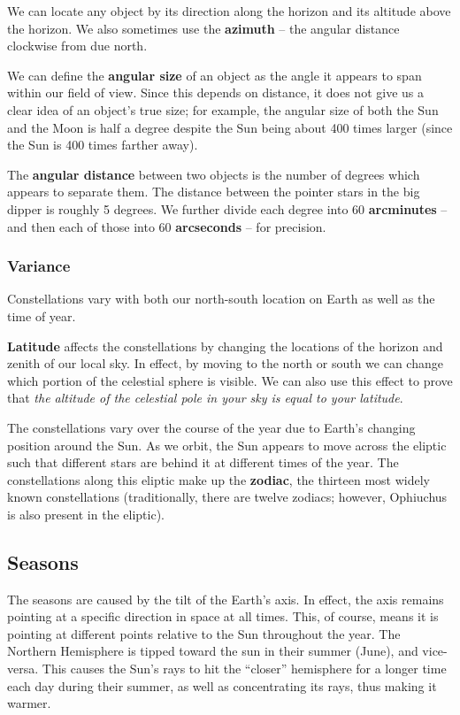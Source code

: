 \documentclass[12pt]{article}
\begin{document}
We can locate any object by its direction along the horizon and its altitude above the horizon. We also sometimes use the {\bf azimuth} -- the angular distance clockwise from due north.

We can define the {\bf angular size} of an object as the angle it appears to span within our field of view. Since this depends on distance, it does not give us a clear idea of an object's true size; for example, the angular size of both the Sun and the Moon is half a degree despite the Sun being about 400 times larger (since the Sun is 400 times farther away).

The {\bf angular distance} between two objects is the number of degrees which appears to separate them. The distance between the pointer stars in the big dipper is roughly 5 degrees. We further divide each degree into 60 {\bf arcminutes} -- and then each of those into 60 {\bf arcseconds} -- for precision.

\subsubsection{Variance}
Constellations vary with both our north-south location on Earth as well as the time of year.

{\bf Latitude} affects the constellations by changing the locations of the horizon and zenith of our local sky. In effect, by moving to the north or south we can change which portion of the celestial sphere is visible. We can also use this effect to prove that \emph{the altitude of the celestial pole in your sky is equal to your latitude}.

The constellations vary over the course of the year due to Earth's changing position around the Sun. As we orbit, the Sun appears to move across the eliptic such that different stars are behind it at different times of the year. The constellations along this eliptic make up the {\bf zodiac}, the thirteen most widely known constellations (traditionally, there are twelve zodiacs; however, Ophiuchus is also present in the eliptic).

\subsection{Seasons}
The seasons are caused by the tilt of the Earth's axis. In effect, the axis remains pointing at a specific direction in space at all times. This, of course, means it is pointing at different points relative to the Sun throughout the year. The Northern Hemisphere is tipped toward the sun in their summer (June), and vice-versa. This causes the Sun's rays to hit the ``closer'' hemisphere for a longer time each day during their summer, as well as concentrating its rays, thus making it warmer.
\end{document}
